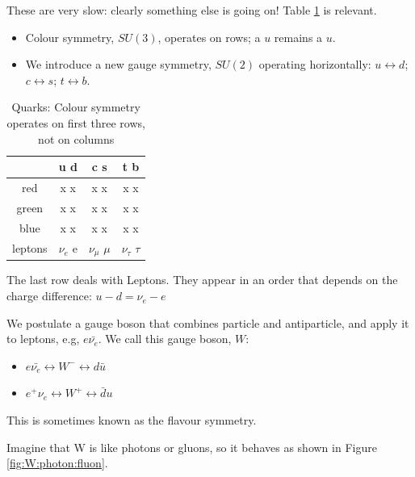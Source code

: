 \documentclass[]{article}
\begin{document}
These are very slow: clearly something else is going on! Table \ref{tab:QCD:rows} is relevant. \begin{itemize}
	\item Colour symmetry, $SU(3)$, operates on rows; a $u$ remains a $u.$
	\item We introduce a new gauge symmetry, $SU(2)$ operating horizontally: $u\leftrightarrow d$;  $c\leftrightarrow s$;  $t\leftrightarrow b$.
\end{itemize}

\begin{table}[H]
	\begin{center}
		\caption{Quarks: Colour symmetry operates on first three rows, not on columns}\label{tab:QCD:rows}
		\begin{tabular}{|c|c|c|c|} \hline
			&u d&c s&t b \\ \hline
			red&x x&x x&x x\\ \hline
			green&x x&x x&x x\\ \hline
			blue&x x&x x&x x\\ \hline
			leptons&$\nu_e$ e&$\nu_\mu$ $\mu$&$\nu_\tau$ $\tau$\\ \hline
		\end{tabular}
	\end{center}
\end{table}

The last row deals with Leptons. They appear in an order that depends on the charge difference: $u-d=\nu_e-e$

We postulate a gauge boson that combines particle and antiparticle, and apply it to leptons, e.g, $e \bar{\nu_e}$. We call this gauge boson, $W$:

 \begin{itemize}
 	\item $e \bar{\nu_e}\leftrightarrow W^- \leftrightarrow d\bar{u}$
 	\item $e^+ \nu_e\leftrightarrow W^+ \leftrightarrow \bar{d}u$
 \end{itemize}

This is sometimes known as the flavour symmetry.

Imagine that W is like photons or gluons, so it behaves as shown in Figure \ref{fig:W:photon:fluon}.
\end{document}
